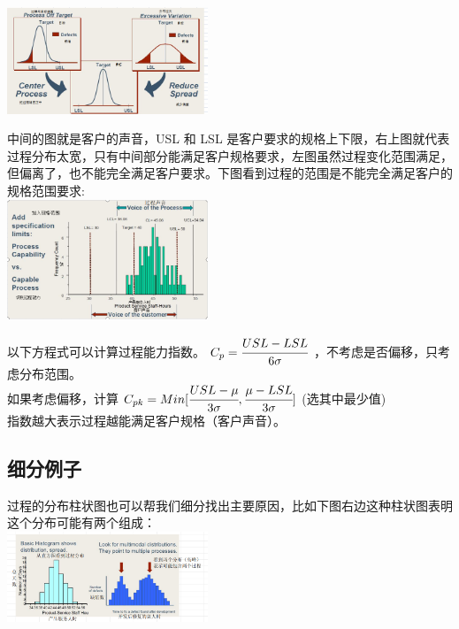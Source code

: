\includegraphics[width=6cm]{微信截图_20231027083326.png}

中间的图就是客户的声音，USL 和 LSL
是客户要求的规格上下限，右上图就代表过程分布太宽，只有中间部分能满足客户规格要求，左图虽然过程变化范围满足，但偏离了，也不能完全满足客户要求。下图看到过程的范围是不能完全满足客户的规格范围要求:\\


\includegraphics[width=6cm]{微信截图_20231025093027.png}

以下方程式可以计算过程能力指数。 \(C_p = \cfrac{USL - LSL}{6 \sigma}\)
，不考虑是否偏移，只考虑分布范围。\\
如果考虑偏移，计算
\(C_{pk} = Min [ \cfrac{USL - \mu}{3 \sigma} , \cfrac{\mu - LSL}{3 \sigma} ]\)
(选其中最少值)\\
指数越大表示过程越能满足客户规格（客户声音）。

\hypertarget{ux7ec6ux5206ux4f8bux5b50}{%
\subsection{细分例子}\label{ux7ec6ux5206ux4f8bux5b50}}

过程的分布柱状图也可以帮我们细分找出主要原因，比如下图右边这种柱状图表明这个分布可能有两个组成：\\


\includegraphics[width=6cm]{微信截图_20231026155926.png}

